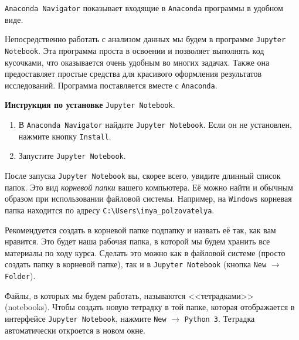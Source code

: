 \documentclass[11pt, a4paper]{extarticle}
\begin{document}
	\lstinline|Anaconda Navigator| показывает входящие в \lstinline|Anaconda| программы в удобном виде.
	
	Непосредственно работать с анализом данных мы будем в программе \lstinline|Jupyter Notebook|.
	Эта программа проста в освоении и позволяет выполнять код кусочками, что оказывается очень удобным во многих задачах.
	Также она предоставляет простые средства для красивого оформления результатов исследований.
	Программа поставляется вместе с \lstinline|Anaconda|.
	
	\begin{shaded}
		\textbf{Инструкция по установке} \lstinline|Jupyter Notebook|.
		\begin{enumerate}
			\item В \lstinline|Anaconda Navigator| найдите \lstinline|Jupyter Notebook|.
			Если он не установлен, нажмите кнопку \lstinline|Install|. 
			\item Запустите \lstinline|Jupyter Notebook|.
		\end{enumerate}
	\end{shaded}

	После запуска \lstinline|Jupyter Notebook| вы, скорее всего, увидите длинный список папок.
	Это вид \textit{корневой папки} вашего компьютера.
	Её можно найти и обычным образом при использовании файловой системы.
	Например, на \lstinline|Windows| корневая папка находится по адресу \lstinline|C:\Users\imya_polzovatelya|.
	
	Рекомендуется создать в корневой папке подпапку и назвать её так, как вам нравится.
	Это будет наша рабочая папка, в которой мы будем хранить все материалы по ходу курса.
	Сделать это можно как в файловой системе (просто создать папку в корневой папке), так и в \lstinline|Jupyter Notebook| (кнопка \lstinline|New| $\to$ \lstinline|Folder|).
	
	Файлы, в которых мы будем работать, называются <<тетрадками>> (notebooks). 
	Чтобы создать новую тетрадку в той папке, которая отображается в интерфейсе \lstinline|Jupyter Notebook|, нажмите \lstinline|New| $\to$ \lstinline|Python 3|.
	Тетрадка автоматически откроется в новом окне.
	
\end{document}
